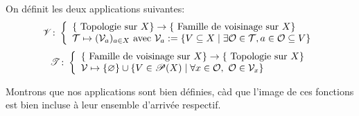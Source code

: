 \begin{definition}
    On définit les deux applications suivantes:
    \begin{align*}
        \mathscr{V}\colon \left\{\begin{array}{l}\{\text{ Topologie sur }X\}\to \{ \text{ Famille de voisinage sur } X\} \\ \mathcal{T}\mapsto (\mathcal{V}_a)_{a\in X}\text{ avec }\mathcal{V}_a := \{V\subseteq X\mid \exists \mathcal{O}\in \mathcal{T}, a\in \mathcal{O}\subseteq V\}\end{array}\right.
    \end{align*}
    \begin{align*}
        \fonction{\mathscr{T}}{\{ \text{ Famille de voisinage sur } X\}\to\{\text{ Topologie sur }X\} }{ \voisinage\mapsto \{ \varnothing\}\cup\{V\in\partie(X)\mid \forall x\in\ouvert,\ \ouvert\in\voisinage_x\}}
    \end{align*}   
\end{definition}
Montrons que nos applications sont bien définies, càd que l'image de ces fonctions est bien incluse à leur ensemble d'arrivée respectif.
